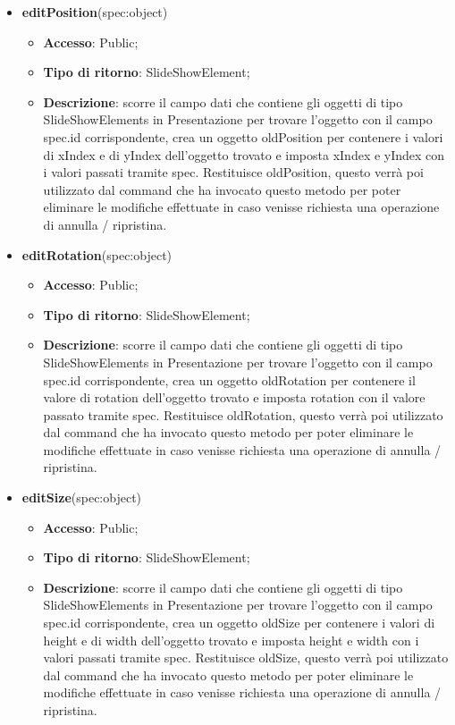 {\begin{itemize}
\begin{itemize}
			\end{itemize}
			\item \textbf{editPosition}(spec:object)
			\begin{itemize}
				\item \textbf{Accesso}: Public;
				\item \textbf{Tipo di ritorno}: SlideShowElement;
				\item \textbf{Descrizione}: scorre il campo dati che contiene gli oggetti di tipo SlideShowElements in Presentazione per trovare l’oggetto con il campo spec.id corrispondente, crea un oggetto oldPosition per contenere i valori di xIndex e di yIndex dell’oggetto trovato e imposta xIndex e yIndex con i valori passati tramite spec. Restituisce oldPosition, questo verrà poi utilizzato dal command che ha invocato questo metodo per poter eliminare le modifiche effettuate in caso venisse richiesta una operazione di annulla / ripristina.
			\end{itemize}
			\item \textbf{editRotation}(spec:object)
			\begin{itemize}
				\item \textbf{Accesso}: Public;
				\item \textbf{Tipo di ritorno}: SlideShowElement;
				\item \textbf{Descrizione}: scorre il campo dati che contiene gli oggetti di tipo SlideShowElements in Presentazione per trovare l’oggetto con il campo spec.id corrispondente, crea un oggetto oldRotation per contenere il valore di rotation dell’oggetto trovato e imposta rotation con il valore passato tramite spec. Restituisce oldRotation, questo verrà poi utilizzato dal command che ha invocato questo metodo per poter eliminare le modifiche effettuate in caso venisse richiesta una operazione di annulla / ripristina.
			\end{itemize}
			\item \textbf{editSize}(spec:object)
			\begin{itemize}
				\item \textbf{Accesso}: Public;
				\item \textbf{Tipo di ritorno}: SlideShowElement;
				\item \textbf{Descrizione}: scorre il campo dati che contiene gli oggetti di tipo SlideShowElements in Presentazione per trovare l’oggetto con il campo spec.id corrispondente, crea un oggetto oldSize per contenere i valori di height e di width dell’oggetto trovato e imposta height e width con i valori passati tramite spec. Restituisce oldSize, questo verrà poi utilizzato dal command che ha invocato questo metodo per poter eliminare le modifiche effettuate in caso venisse richiesta una operazione di annulla / ripristina.

\end{itemize}
\end{itemize}}
